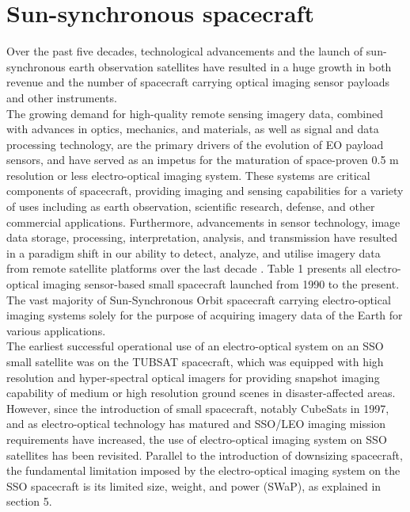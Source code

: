 \documentclass[final,5p,times,twocolumn,authoryear]{elsarticle}
\begin{document}
\section{Sun-synchronous spacecraft}
Over the past five decades, technological advancements and the launch of sun-synchronous earth observation satellites have resulted in a huge growth in both revenue and the number of spacecraft carrying optical imaging sensor payloads and other instruments.  \\
The growing demand for high-quality remote sensing imagery data, combined with advances in optics, mechanics, and materials, as well as signal and data processing technology, are the primary drivers of the evolution of EO payload sensors, and have served as an impetus for the maturation of space-proven 0.5 m resolution or less \citep{demirel2005one, sandau2010status} electro-optical imaging system. These systems are critical components of spacecraft, providing imaging and sensing capabilities for a variety of uses including as earth observation, scientific research, defense, and other commercial applications. Furthermore, advancements in sensor technology, image data storage, processing, interpretation, analysis, and transmission have resulted in a paradigm shift in our ability to detect, analyze, and utilise imagery data from remote satellite platforms over the last decade \cite{arthur1997}. Table 1 presents all electro-optical imaging sensor-based small spacecraft launched from 1990 to the present.\\
The vast majority of Sun-Synchronous Orbit spacecraft carrying electro-optical imaging systems solely for the purpose of acquiring imagery data of the Earth for various applications.\\
The earliest successful operational use of an electro-optical system on an SSO small satellite was on the TUBSAT spacecraft, which was equipped with high resolution and hyper-spectral optical imagers \citep{roemer2003flight} for providing snapshot imaging capability of medium or high resolution ground scenes in disaster-affected areas. \\
However, since the introduction of small spacecraft, notably CubeSats in 1997, and as electro-optical technology has matured and SSO/LEO imaging mission requirements have increased, the use of electro-optical imaging system on SSO satellites has been revisited.
Parallel to the introduction of downsizing spacecraft, the fundamental limitation imposed by the electro-optical imaging system on the SSO spacecraft is its limited size, weight, and power (SWaP), as explained in section 5.  \\
\end{document}
